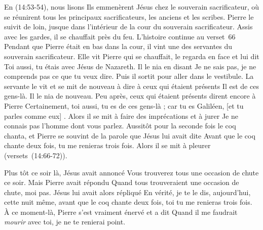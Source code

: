 En (14:53-54), nous lisons\frcolon{}
 \Og Ils emmenèrent Jésus chez le souverain sacrificateur,
 où se réunirent tous les principaux sacrificateurs,
 les anciens et les scribes.
 Pierre le suivit de loin, jusque dans l'intérieur de la cour
 du souverain sacrificateur.
 Assis avec les gardes, il se chauffait près du feu. \Fg{}
 L'histoire continue au verset~66\frcolon{}
 \Og Pendant que Pierre était en bas dans la cour,
 il vint une des servantes du souverain sacrificateur.
 Elle vit Pierre qui se chauffait, le regarda en face et lui dit\frcolon{}
 Toi aussi, tu étais avec Jésus de Nazareth. Il le nia en disant\frcolon{}
 Je ne sais pas, je ne comprends pas ce que tu veux dire.
 Puis il sortit pour aller dans le vestibule.
 La servante le vit et se mit de nouveau à dire
 à ceux qui étaient présents\frcolon{} Il est de ces \mbox{gens-là}.
 Il le nia de nouveau. Peu après, ceux qui étaient présents
 dirent encore à Pierre\frcolon{} Certainement, toi aussi,
 tu es de ces gens-là ; car tu es Galiléen, [et tu parles comme eux] .
 Alors il se mit à faire des imprécations et à jurer\frcolon{}
 Je ne connais pas l'homme dont vous parlez. Aussitôt pour la seconde fois
 le coq chanta, et Pierre se souvint de la parole que Jésus lui avait dite\frcolon{}
 Avant que le coq chante deux fois, tu me renieras trois fois.
 Alors il se mit à pleurer \Fg{} (versets~(14:66-72)).

Plus tôt ce soir là, Jésus avait annoncé\frcolon{}
 \Og Vous trouverez tous une occasion de chute ce soir. \Fg{}
 Mais Pierre avait répondu\frcolon{}
 \Og Quand tous trouveraient une occasion de chute, moi pas. \Fg{}
 Jésus lui avait alors répliqué\frcolon{}
 \Og En vérité, je te le dis, aujourd'hui, cette nuit même,
 avant que le coq chante deux fois, toi tu me renieras trois fois. \Fg{}
 À ce moment-là, Pierre s'est vraiment énervé et a dit\frcolon{}
 \Og Quand il me faudrait \emph{mourir} avec toi, je ne te renierai point. \Fg{}

